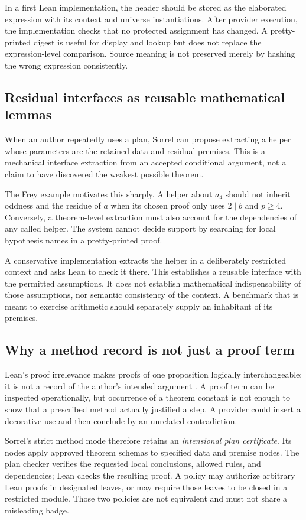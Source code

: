 \documentclass[11pt,a4paper]{article}
\numberwithin{equation}{section}
\theoremstyle{definition}\newtheorem{definition}[theorem]{Definition}
\theoremstyle{remark}\newtheorem{remark}[theorem]{Remark}
\begin{document}
In a first Lean implementation, the header should be stored as the elaborated
expression with its context and universe instantiations. After provider
execution, the implementation checks that no protected assignment has changed.
A pretty-printed digest is useful for display and lookup but does not replace
the expression-level comparison. Source meaning is not preserved merely by
hashing the wrong expression consistently.

\subsection{Residual interfaces as reusable mathematical lemmas}
When an author repeatedly uses a plan, Sorrel can propose extracting a helper
whose parameters are the retained data and residual premises. This is a
mechanical interface extraction from an accepted conditional argument, not a
claim to have discovered the weakest possible theorem.

The Frey example motivates this sharply. A helper about \(a_4\) should not
inherit oddness and the residue of \(a\) when its chosen proof only uses
\(2\mid b\) and \(p\ge4\). Conversely, a theorem-level extraction must also
account for the dependencies of any called helper. The system cannot decide
support by searching for local hypothesis names in a pretty-printed proof.

A conservative implementation extracts the helper in a deliberately restricted
context and asks Lean to check it there. This establishes a reusable interface
with the permitted assumptions. It does not establish mathematical
indispensability of those assumptions, nor semantic consistency of the
context. A benchmark that is meant to exercise arithmetic should separately
supply an inhabitant of its premises.

\subsection{Why a method record is not just a proof term}
Lean's proof irrelevance makes proofs of one proposition logically
interchangeable; it is not a record of the author's intended argument
\cite{leanAxioms}. A proof term can be inspected operationally, but occurrence
of a theorem constant is not enough to show that a prescribed method actually
justified a step. A provider could insert a decorative use and then conclude
by an unrelated contradiction.

Sorrel's strict method mode therefore retains an \emph{intensional plan
certificate}. Its nodes apply approved theorem schemas to specified data and
premise nodes. The plan checker verifies the requested local conclusions,
allowed rules, and dependencies; Lean checks the resulting proof. A policy
may authorize arbitrary Lean proofs in designated leaves, or may require
those leaves to be closed in a restricted module. Those two policies are not
equivalent and must not share a misleading badge.
\end{document}
